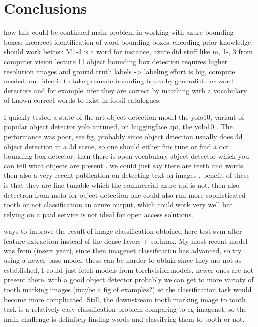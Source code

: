 \documentclass{article}
\begin{document}
\section{Conclusions}

how this could be continued
main problem in working with azure bounding boxes: incorrect identification of word bounding boxes.
encoding prior knowledge should work better: M1-3 is a word for instance, azure did stuff like m, 1-, 3
from computer vision lecture 11 \cite{ruotsalainen2024}
object bounding box detection requires higher resolution images and ground truth labels -> labeling effort is 
big, compute needed. one idea is to take premade bounding boxes by generalist ocr word detectors and for example
infer they are correct by matching with a vocabulary of known correct words to exist in fossil catalogues.

I quickly tested a state of the art object detection model the yolo10, variant of popular object detector yolo\cite{redmonYouOnlyLook2016}
 untuned, on huggingface api, the yolo10 \cite{OmouredYOLOv10DocumentLayoutAnalysisHugging2023}. The performance 
was poor, see fig, probably since object detection usually does 3d object detection in a 3d scene, so one should either 
fine tune or find a ocr bounding box detector. then there is open-vocabulary object detector which you can tell what objects 
are present \cite{YOLOWorldRealTimeOpenVocabulary}. we could just say there are teeth and words. 
then also a very recent publication on detecting text on images \cite{longHierarchicalTextSpotter2024}.
benefit of these is that they are fine-tunable which the commercial azure api is not. 
then also detectron \cite{Detectron} from meta for object detection
one could also run more sophisticated 
tooth or not classification on azure output, which could work very well but relying on a paid service is not ideal 
for open access solutions.

ways to improve the result of image classification obtained here 
test svm after feature extraction instead of the dense layers + softmax. My most recent model was from (insert year),
since then imagenet classification has advanced, so try using a newer base model. these can be harder to obtain 
since they are not as established, I could just fetch models from torchvision.models, newer ones are not present there.
with a good object detector probably we can get to more variaty of tooth marking images (maybe a fig of examples?)
so the classification task would become more complicated. Still, the downstream tooth marking image to tooth task 
is a relatively easy classification problem comparing to eg imagenet, so the main challenge is definitely finding words and
classifying them to tooth or not.
\end{document}
